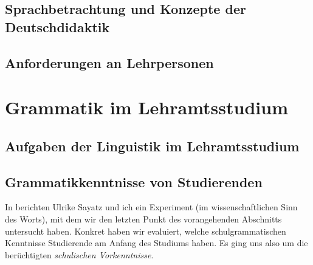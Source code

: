 \subsection{Sprachbetrachtung und Konzepte der Deutschdidaktik}
\label{sec:sprachbetrachtungundkonzeptederdeutschdidaktik}


\subsection{Anforderungen an Lehrpersonen}
\label{sec:anforderungenanlehrpersonen}



\section{Grammatik im Lehramtsstudium}
\label{sec:grammatikimlehramtsstudium}

\subsection{Aufgaben der Linguistik im Lehramtsstudium}
\label{sec:aufgabenderlinguistikimlehramtsstudium}

\subsection{Grammatikkenntnisse von Studierenden}
\label{sec:grammatikkentnissevonstudierenden}

In \citet{SchaeferSayatz2017a} berichten Ulrike Sayatz und ich ein Experiment (im wissenschaftlichen Sinn des Worts), mit dem wir den letzten Punkt des vorangehenden Abschnitts untersucht haben.
Konkret haben wir evaluiert, welche schulgrammatischen Kenntnisse Studierende am Anfang des Studiums haben.
Es ging uns also um die berüchtigten \textit{schulischen Vorkenntnisse}.

